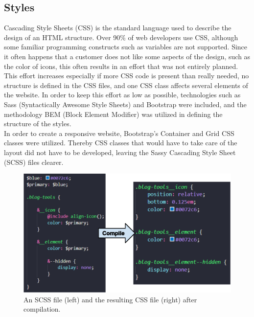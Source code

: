 \documentclass[Bachelor,BIF,english]{twbook}
\begin{document}
\subsection{Styles}
Cascading Style Sheets (CSS) is the standard language used to describe the design of an HTML structure. Over 90\% of web developers use CSS, although some familiar programming constructs such as variables are not supported. Since it often happens that a customer does not like some aspects of the design, such as the color of icons, this often results in an effort that was not entirely planned. This effort increases especially if more CSS code is present than really needed, no structure is defined in the CSS files, and one CSS class affects several elements of the website. In order to keep this effort as low as possible, technologies such as Sass (Syntactically Awesome Style Sheets) \cite{Sass} and Bootstrap \cite{Bootstrap} were included, and the methodology BEM (Block Element Modifier) \cite{BEM} was utilized in defining the structure of the styles.
\\[\baselineskip]
In order to create a responsive website, Bootstrap's Container \cite{BootstrapContainer} and Grid \cite{BootstrapGrid} CSS classes were utilized. Thereby CSS classes that would have to take care of the layout did not have to be developed, leaving the Sassy Cascading Style Sheet (SCSS) files clearer.
\\[\baselineskip]
\begin{figure}[!htbp]
\centering
\includegraphics[width=1\linewidth]{PICs/sass_parent-selector_mixins_variables.eps}
\caption{An SCSS file (left) and the resulting CSS file (right) after compilation.}\label{FigSass}
\end{figure}
\end{document}
